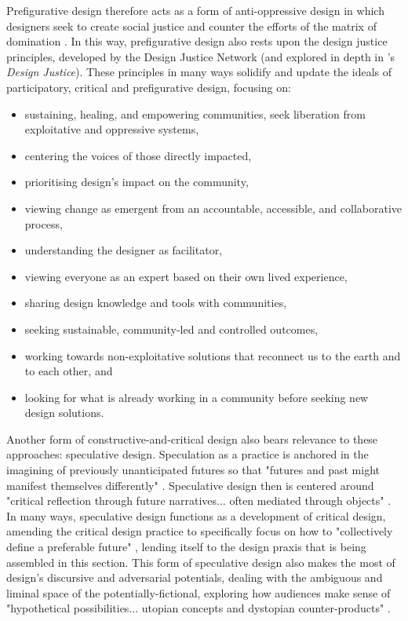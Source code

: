 Prefigurative design therefore acts as a form of anti-oppressive design \citep{smyth_anti-oppressive_2014} in which designers seek to create social justice and counter the efforts of the matrix of domination \citep{collins_black_2002}. In this way, prefigurative design also rests upon the design justice principles, developed by the Design Justice Network (and explored in depth in \citet{costanza-chock_design_2020}'s \emph{Design Justice}). These principles in many ways solidify and update the ideals of participatory, critical and prefigurative design, focusing on: 
\begin{itemize}
\item sustaining, healing, and empowering communities, seek liberation from exploitative and oppressive systems,
\item centering the voices of those directly impacted,
\item prioritising design's impact on the community,
\item viewing change as emergent from an accountable, accessible, and collaborative process,
\item understanding the designer as facilitator,
\item viewing everyone as an expert based on their own lived experience,
\item sharing design knowledge and tools with communities,
\item seeking sustainable, community-led and controlled outcomes,
\item working towards non-exploitative solutions that reconnect us to the earth and to each other, and
\item looking for what is already working in a community before seeking new design solutions.
\end{itemize}

Another form of constructive-and-critical design also bears relevance to these approaches: speculative design. Speculation as a practice is anchored in the imagining of previously unanticipated futures so that "futures and past might manifest themselves differently" \citep[p. 1]{gatehouse_hauntology_2020}. Speculative design then is centered around "critical reflection through future narratives... often mediated through objects" \citep{forlano_ethnographies_2013}. In many ways, speculative design functions as a development of critical design, amending the critical design practice to specifically focus on how to "collectively define a preferable future" \cite[p. 6]{dunne_speculative_2013}, lending itself to the design praxis that is being assembled in this section. This form of speculative design also makes the most of design's discursive and adversarial potentials, dealing with the ambiguous and liminal space of the potentially-fictional, exploring how audiences make sense of "hypothetical possibilities... utopian concepts and dystopian counter-products" \citep[p. 32]{auger_speculative_2013}.

